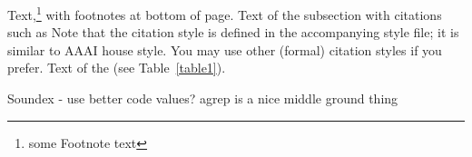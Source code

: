 \documentclass[11pt]{article}
\begin{document}
Text,\footnote{some Footnote text} with footnotes at bottom of page.
Text of the subsection with citations such as 
Note that the citation style is defined in the accompanying
style file; it is similar to AAAI house style. You may use
other (formal) citation styles if you prefer.
Text of the (see Table~\ref{table1}).


Soundex - use better code values?
agrep is a nice middle ground thing
\end{document}
